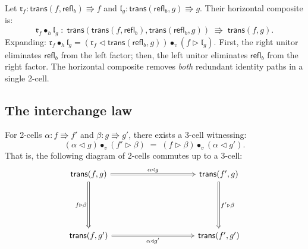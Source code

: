 \documentclass[manuscript]{BSLstyle}
\newcommand{\refl}{\mathsf{refl}}
\newcommand{\trans}{\mathsf{trans}}
\begin{document}
\begin{example}\label{ex:hcomp-concrete}
Let $\mathfrak{r}_f : \trans(f, \refl_b) \Rrightarrow f$ and
$\mathfrak{l}_g : \trans(\refl_b, g) \Rrightarrow g$.  Their horizontal
composite is:
\[
\mathfrak{r}_f \bullet_h \mathfrak{l}_g
  \;:\;
  \trans(\trans(f, \refl_b), \trans(\refl_b, g))
  \;\Rrightarrow\;
  \trans(f, g).
\]
Expanding: $\mathfrak{r}_f \bullet_h \mathfrak{l}_g
= (\mathfrak{r}_f \triangleleft \trans(\refl_b, g))
   \bullet_v
   (f \triangleright \mathfrak{l}_g)$.
First, the right unitor eliminates $\refl_b$ from the left factor; then,
the left unitor eliminates $\refl_b$ from the right factor.  The horizontal
composite removes \emph{both} redundant identity paths in a single 2-cell.
\end{example}

\subsection{The interchange law}

\begin{theorem}\label{thm:interchange}
For 2-cells $\alpha : f \Rrightarrow f'$ and $\beta : g \Rrightarrow g'$,
there exists a 3-cell witnessing:
\[
(\alpha \triangleleft g) \bullet_v (f' \triangleright \beta)
\;=\;
(f \triangleright \beta) \bullet_v (\alpha \triangleleft g').
\]
That is, the following diagram of 2-cells commutes up to a 3-cell:
\[
\begin{tikzcd}[column sep=3.5cm, row sep=2cm]
\trans(f, g)
  \ar[r, Rightarrow, "\alpha \triangleleft g"]
  \ar[d, Rightarrow, "f \triangleright \beta"']
& \trans(f', g)
  \ar[d, Rightarrow, "f' \triangleright \beta"]
\\
\trans(f, g')
  \ar[r, Rightarrow, "\alpha \triangleleft g'"']
& \trans(f', g')
\end{tikzcd}
\]
\end{theorem}
\end{document}
